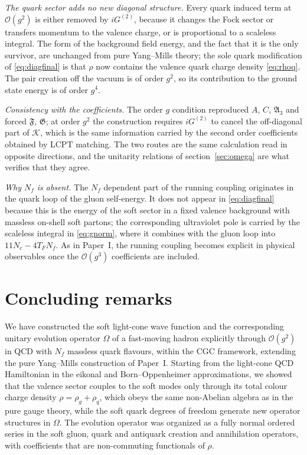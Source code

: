 \documentclass[11pt,a4paper]{article}
\numberwithin{equation}{section}
\newcommand{\mf}[1]{\mathfrak{#1}}
\newcommand{\OM}{\Omega}
\newcommand{\order}[1]{\mathcal{O}(#1)}
\newcommand{\Nf}{N_{f}}
\begin{document}
\emph{The quark sector adds no new diagonal structure.} Every quark induced term at $\order{g^{2}}$ is
either removed by $iG^{(2)}$, because it changes the Fock sector or transfers momentum to the valence
charge, or is proportional to a scaleless integral. The form of the background field energy, and the
fact that it is the only survivor, are unchanged from pure Yang--Mills theory; the sole quark
modification of \eqref{eq:diagfinal} is that $\rho$ now contains the valence quark charge density
\eqref{eq:rhoq}. The pair creation off the vacuum is of order $g^{2}$, so its contribution to the
ground state energy is of order $g^{4}$.

\emph{Consistency with the coefficients.} The order $g$ condition reproduced $A$, $C$, $\mf A_{3}$ and
forced $\mf F$, $\mf G$; at order $g^{2}$ the construction requires $iG^{(2)}$ to cancel the off-diagonal part
of $\mathcal K$, which is the same information carried by the second order coefficients obtained by
LCPT matching. The two routes are the same calculation read in opposite directions, and the
unitarity relations of section~\ref{sec:omega} are what verifies that they agree.

\emph{Why $\Nf$ is absent.} The $\Nf$ dependent part of the running coupling originates in the quark
loop of the gluon self-energy. It does not appear in \eqref{eq:diagfinal} because this is the energy
of the soft sector in a fixed valence background with massless on-shell soft partons; the
corresponding ultraviolet pole is carried by the scaleless integral in \eqref{eq:gnorm}, where it
combines with the gluon loop into $11N_{c}-4T_{F}\Nf$. As in Paper~I, the running coupling becomes
explicit in physical observables once the $\order{g^{3}}$ coefficients are included.

\section{Concluding remarks}
\label{sec:concl}

We have constructed the soft light-cone wave function and the corresponding unitary evolution
operator $\OM$ of a fast-moving hadron explicitly through $\order{g^{2}}$ in QCD with $\Nf$ massless
quark flavours, within the CGC framework, extending the pure Yang--Mills construction of Paper~I.
Starting from the light-cone QCD Hamiltonian in the eikonal and Born--Oppenheimer approximations,
we showed that the valence sector couples to the soft modes only through its total colour charge
density $\rho=\rho_{g}+\rho_{q}$, which obeys the same non-Abelian algebra as in the pure gauge theory,
while the soft quark degrees of freedom generate new operator structures in $\OM$. The evolution
operator was organized as a fully normal ordered series in the soft gluon, quark and antiquark
creation and annihilation operators, with coefficients that are non-commuting functionals of $\rho$.
\end{document}
